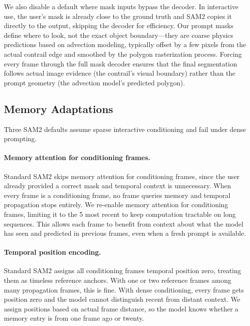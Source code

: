 \documentclass[1p,11pt]{elsarticle}
\begin{document}
We also disable a default where mask inputs bypass the decoder. In interactive use, the user's mask is already close to the ground truth and SAM2 copies it directly to the output, skipping the decoder for efficiency. Our prompt masks define where to look, not the exact object boundary---they are coarse physics predictions based on advection modeling, typically offset by a few pixels from the actual contrail edge and smoothed by the polygon rasterization process. Forcing every frame through the full mask decoder ensures that the final segmentation follows actual image evidence (the contrail's visual boundary) rather than the prompt geometry (the advection model's predicted polygon).

\subsection{Memory Adaptations}

Three SAM2 defaults assume sparse interactive conditioning and fail under dense prompting.

\paragraph{Memory attention for conditioning frames.} Standard SAM2 skips memory attention for conditioning frames, since the user already provided a correct mask and temporal context is unnecessary. When every frame is a conditioning frame, no frame queries memory and temporal propagation stops entirely. We re-enable memory attention for conditioning frames, limiting it to the 5 most recent to keep computation tractable on long sequences. This allows each frame to benefit from context about what the model has seen and predicted in previous frames, even when a fresh prompt is available.

\paragraph{Temporal position encoding.} Standard SAM2 assigns all conditioning frames temporal position zero, treating them as timeless reference anchors. With one or two reference frames among many propagation frames, this is fine. With dense conditioning, every frame gets position zero and the model cannot distinguish recent from distant context. We assign positions based on actual frame distance, so the model knows whether a memory entry is from one frame ago or twenty.
\end{document}
